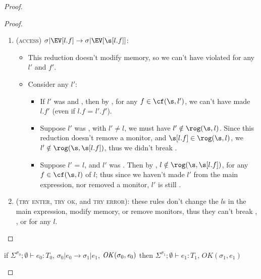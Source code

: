 \begin{proof}
\begin{proof}
\begin{enumerate}
\item (\textsc{access}) $\sigma|\EV[l.f]\rightarrow \sigma|\EV[\s[l.f]]$:
\begin{itemize}
	\item This reduction doesn't modify memory, so we can't have violated \CNC for any $l'$ and $f'$.
	\item Consider any $l'$:
	\begin{itemize}
		\item If $l'$ was \CNE and \CNA, then by , for any $f \in \cf(\s, l')$, we can't have made $l.f'$ \tmuty (even if $l.f$ = $l'.f'$).
		\item Suppose $l'$ was \CNO, with $l' \neq l$, we must have $l' \notin \rog(\s, l)$. Since this reduction doesn't remove a monitor, and $\s[l.f] \in \rog(\s, l)$, we $l' \notin \rog(\s, \s[l.f])$, thus we didn't break \CNO.
		\item Suppose $l'$ = $l$, and $l'$ was \CNO. Then by \CNC, $l \notin \rog(\s, \s[l.f])$, for any $f \in \cf(\s, l)$ of $l$; thus since we haven't made $l'$ \reach from the main expression, nor removed a monitor, $l'$ is still \CNO.
	\end{itemize}
\end{itemize}
\item (\textsc{try enter}, \textsc{try ok}, and \textsc{try error}):
these rules don't change the $l$s in the main expression, modify memory, or remove monitors, thus they can't break \CNC, \CNE, or \CNO for any $l$.
\end{enumerate}
\end{proof}
\vfill
{}
\begin{theorem}\rm
if $\Sigma^{\sigma_0};\emptyset\vdash e_0: T_0$,
$\sigma_0|e_0\rightarrow \sigma_1|e_1$,
$\mathit{OK}(\sigma_0,{\mathit{e}}_0)$
then
$\Sigma^{\sigma_1};\emptyset\vdash e_1: T_1$,
$\mathit{OK}(\sigma_1,e_1)$
\end{theorem}


\end{proof}
